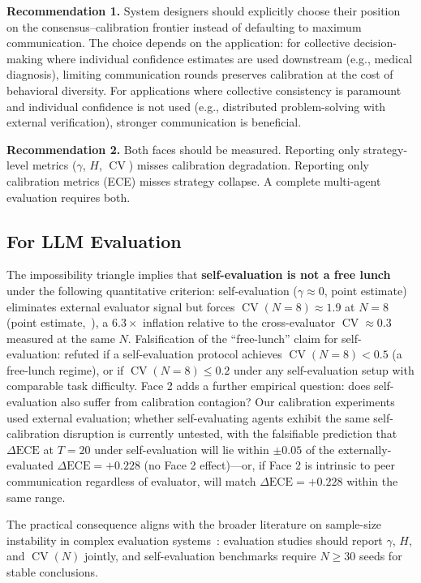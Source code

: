\documentclass[11pt]{article}
\DeclareMathOperator{\CV}{CV}
\begin{document}
\textbf{Recommendation 1.} System designers should explicitly choose their position on the consensus--calibration frontier instead of defaulting to maximum communication. The choice depends on the application: for collective decision-making where individual confidence estimates are used downstream (e.g., medical diagnosis), limiting communication rounds preserves calibration at the cost of behavioral diversity. For applications where collective consistency is paramount and individual confidence is not used (e.g., distributed problem-solving with external verification), stronger communication is beneficial.

\textbf{Recommendation 2.} Both faces should be measured. Reporting only strategy-level metrics ($\gamma$, $H$, $\CV$) misses calibration degradation. Reporting only calibration metrics (ECE) misses strategy collapse. A complete multi-agent evaluation requires both.

\subsection{For LLM Evaluation}

The impossibility triangle implies that \textbf{self-evaluation is not a free lunch} under the following quantitative criterion: self-evaluation ($\gamma \approx 0$, point estimate) eliminates external evaluator signal but forces $\CV(N{=}8) \approx 1.9$ at $N = 8$ (point estimate,~\cite{impossible2026}), a $6.3\times$ inflation relative to the cross-evaluator $\CV \approx 0.3$ measured at the same $N$. Falsification of the ``free-lunch'' claim for self-evaluation: refuted if a self-evaluation protocol achieves $\CV(N{=}8) < 0.5$ (a free-lunch regime), or if $\CV(N{=}8) \leq 0.2$ under any self-evaluation setup with comparable task difficulty. Face 2 adds a further empirical question: does self-evaluation also suffer from calibration contagion? Our calibration experiments used external evaluation; whether self-evaluating agents exhibit the same self-calibration disruption is currently untested, with the falsifiable prediction that $\Delta\text{ECE}$ at $T = 20$ under self-evaluation will lie within $\pm 0.05$ of the externally-evaluated $\Delta\text{ECE} = +0.228$ (no Face 2 effect)---or, if Face 2 is intrinsic to peer communication regardless of evaluator, will match $\Delta\text{ECE} = +0.228$ within the same range.

The practical consequence aligns with the broader literature on sample-size instability in complex evaluation systems~\cite{button2013power,ioannidis2005most}: evaluation studies should report $\gamma$, $H$, and $\CV(N)$ jointly, and self-evaluation benchmarks require $N \geq 30$ seeds for stable conclusions.
\end{document}
